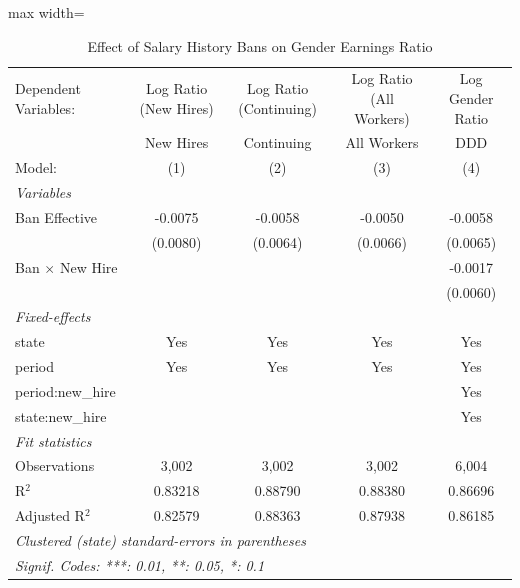 
\begin{table}[htbp]
   \caption{\label{tab:main} Effect of Salary History Bans on Gender Earnings Ratio}
   \centering
   \begin{adjustbox}{max width=\textwidth}
   \begin{tabular}{lcccc}
      \tabularnewline \midrule \midrule
      Dependent Variables:   & Log Ratio (New Hires) & Log Ratio (Continuing) & Log Ratio (All Workers) & Log Gender Ratio\\  
                             & New Hires             & Continuing             & All Workers             & DDD \\   
      Model:                 & (1)                   & (2)                    & (3)                     & (4)\\  
      \midrule
      \emph{Variables}\\
      Ban Effective          & -0.0075               & -0.0058                & -0.0050                 & -0.0058\\   
                             & (0.0080)              & (0.0064)               & (0.0066)                & (0.0065)\\   
      Ban $\times$ New Hire  &                       &                        &                         & -0.0017\\   
                             &                       &                        &                         & (0.0060)\\   
      \midrule
      \emph{Fixed-effects}\\
      state                  & Yes                   & Yes                    & Yes                     & Yes\\  
      period                 & Yes                   & Yes                    & Yes                     & Yes\\  
      period:new\_hire       &                       &                        &                         & Yes\\  
      state:new\_hire        &                       &                        &                         & Yes\\  
      \midrule
      \emph{Fit statistics}\\
      Observations           & 3,002                 & 3,002                  & 3,002                   & 6,004\\  
      R$^2$                  & 0.83218               & 0.88790                & 0.88380                 & 0.86696\\  
      Adjusted R$^2$         & 0.82579               & 0.88363                & 0.87938                 & 0.86185\\  
      \midrule \midrule
      \multicolumn{5}{l}{\emph{Clustered (state) standard-errors in parentheses}}\\
      \multicolumn{5}{l}{\emph{Signif. Codes: ***: 0.01, **: 0.05, *: 0.1}}\\
   \end{tabular}
   \end{adjustbox}


\end{table}
